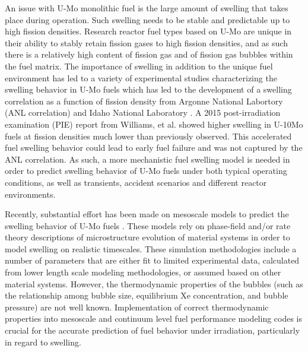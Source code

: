 \documentclass[review]{elsarticle}
\begin{document}
An issue with U-Mo monolithic fuel is the large amount of swelling that takes place during operation\cite{hofman1997}. Such swelling needs to be stable and predictable up to high fission densities. Research reactor fuel types based on U-Mo are unique in their ability to stably retain fission gases to high fission densities, and as such there is a relatively high content of fission gas and of fission gas bubbles within the fuel matrix. The importance of swelling in addition to the unique fuel environment has led to a variety of experimental studies characterizing the swelling behavior in U-Mo fuels \cite{rest2009, kim_anl08, meyer2002, kim2013} which has led to the development of a swelling correlation as a function of fission density from Argonne National Labortory (ANL correlation) \cite{kim2011} and Idaho National Laboratory \cite{umo_prelim_report2017}. A 2015 post-irradiation examination (PIE) report \cite{afip6report} from Williams, et al. showed higher swelling in U-10Mo fuels at fission densities much lower than previously observed. This accelerated fuel swelling behavior could lead to early fuel failure and was not captured by the ANL correlation. As such, a more mechanistic fuel swelling model is needed in order to predict swelling behavior of U-Mo fuels under both typical operating conditions, as well as transients, accident scenarios and different reactor environments.

Recently, substantial effort has been made on mesoscale models to predict the swelling behavior of U-Mo fuels \cite{liang2018, liang2018a, liang2017, liang2016, ye2018, hu2017a, hu2016, hu2016a}. These models rely on phase-field and/or rate theory descriptions of microstructure evolution of material systems in order to model swelling on realistic timescales. These simulation methodologies include a number of parameters that are either fit to limited experimental data, calculated from lower length scale modeling methodologies, or assumed based on other material systems. However, the thermodynamic properties of the bubbles (such as the relationship among bubble size, equilibrium Xe concentration, and bubble pressure) are not well known. Implementation of correct thermodynamic properties into mesoscale and continuum level fuel performance modeling codes is crucial for the accurate prediction of fuel behavior under irradiation, particularly in regard to swelling. 
\end{document}

